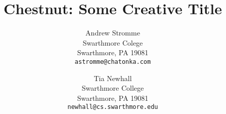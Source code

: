 \documentclass[11pt]{article}
\begin{document}
\title{Chestnut: Some Creative Title}

\author{
  Andrew Stromme \\                 
  Swarthmore Colege \\
  Swarthmore, PA 19081 \\
  {\tt astromme@chatonka.com}
  \and
  Tia Newhall\\
  Swarthmore College \\
  Swarthmore, PA 19081 \\
  {\tt newhall@cs.swarthmore.edu} \\
  }

\date{}
\maketitle














\end{document}
